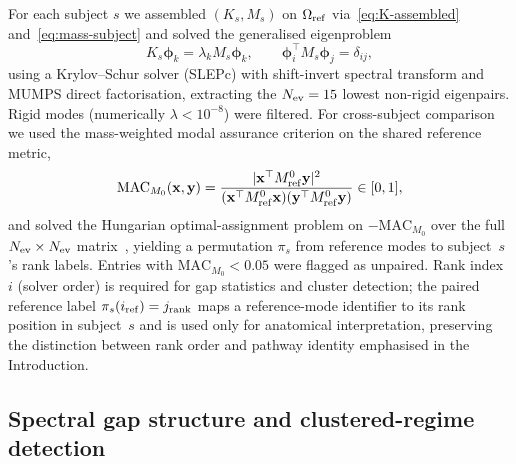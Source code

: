 \documentclass[11pt]{article}
\begin{document}
For each subject $s$ we assembled $(K_s,M_s)$ on $\Omega_{\rm ref}$ via~\eqref{eq:K-assembled} and~\eqref{eq:mass-subject} and solved the generalised eigenproblem
\begin{equation}
K_s\boldsymbol\phi_k=\lambda_k M_s\boldsymbol\phi_k,\qquad
\boldsymbol\phi_i^\top M_s \boldsymbol\phi_j=\delta_{ij},
\label{eq:gep}
\end{equation}
using a Krylov--Schur solver (SLEPc) with shift-invert spectral transform and MUMPS direct factorisation, extracting the $N_{\rm ev}=15$ lowest non-rigid eigenpairs.
Rigid modes (numerically $\lambda<10^{-8}$) were filtered.
For cross-subject comparison we used the mass-weighted modal assurance criterion on the shared reference metric,
\begin{equation}
\mathrm{MAC}_{M_0}(\mathbf x,\mathbf y)=
\frac{|\mathbf x^\top M_{\rm ref}^{0}\mathbf y|^2}
{(\mathbf x^\top M_{\rm ref}^{0}\mathbf x)(\mathbf y^\top M_{\rm ref}^{0}\mathbf y)}\in[0,1],
\label{eq:mac}
\end{equation}
and solved the Hungarian optimal-assignment problem on $-\mathrm{MAC}_{M_0}$ over the full $N_{\rm ev}\times N_{\rm ev}$ matrix~\citep{Kuhn1955Hungarian}, yielding a permutation $\pi_s$ from reference modes to subject~$s$'s rank labels.
Entries with $\mathrm{MAC}_{M_0}<0.05$ were flagged as unpaired.
Rank index~$i$ (solver order) is required for gap statistics and cluster detection; the paired reference label $\pi_s(i_{\rm ref})=j_{\rm rank}$ maps a reference-mode identifier to its rank position in subject~$s$ and is used only for anatomical interpretation, preserving the distinction between rank order and pathway identity emphasised in the Introduction.

\subsection{Spectral gap structure and clustered-regime detection}
\label{sec:gaps}
\end{document}
